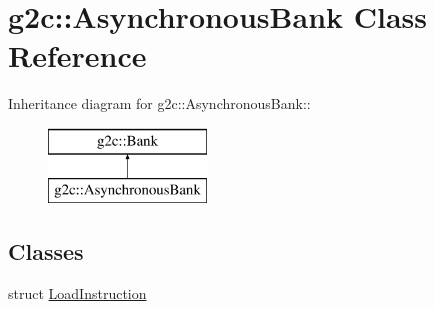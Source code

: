 \hypertarget{classg2c_1_1_asynchronous_bank}{
\section{g2c::AsynchronousBank Class Reference}
\label{classg2c_1_1_asynchronous_bank}
}
Inheritance diagram for g2c::AsynchronousBank::\begin{figure}[H]
\begin{center}
\leavevmode
\includegraphics[height=2cm]{classg2c_1_1_asynchronous_bank}
\end{center}
\end{figure}
\subsection*{Classes}
\begin{DoxyCompactItemize}
\item 
struct \hyperlink{structg2c_1_1_asynchronous_bank_1_1_load_instruction}{LoadInstruction}
\end{DoxyCompactItemize}
